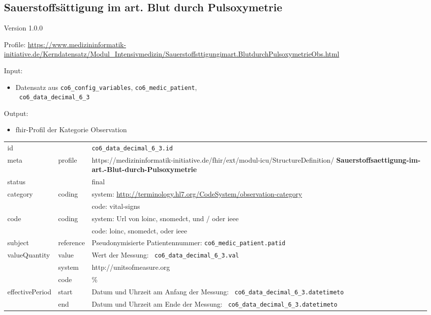 \subsection{Sauerstoffsättigung im art. Blut durch Pulsoxymetrie} 
\noindent Version 1.0.0

\noindent Profile: \url{https://www.medizininformatik-initiative.de/Kerndatensatz/Modul_Intensivmedizin/Sauerstoffsttigungimart.BlutdurchPulsoxymetrieObs.html}

\noindent Input:
\begin{itemize}
	\item Datensatz aus \texttt{co6\_config\_variables}, \texttt{co6\_medic\_patient}, \\ \texttt{
co6\_data\_decimal\_6\_3}
\end{itemize}
Output:
\begin{itemize}
        \item \ac{fhir}-Profil der Kategorie \glqq Observation\grqq{}
\end{itemize}
\begin{longtable}{|l|l|p{7.5cm}|}
        \hline
        \rowcolor{lightgray} \multicolumn{3}{|l|}{Data Mapping (inhaltlich)} \\ \hline
        id &  & \texttt{co6\_data\_decimal\_6\_3.id} \\ \hline
	meta & profile & https://medizininformatik-initiative.de/fhir/ext/modul-icu/StructureDefinition/\textbf{
Sauerstoffsaettigung-im-art.-Blut-durch-Pulsoxymetrie} \\ \hline 
	status &  & final  \\ \hline 
	category & coding & system: \url{http://terminology.hl7.org/CodeSystem/observation-category} \\
\cline{3-3}
	& & code: vital-signs \\ \hline
	code & coding & system: Url von \ac{loinc}, \ac{snomedct}, und / oder \ac{ieee} \\ 
	\cline{3-3} 
	 &  & code: \ac{loinc}, \ac{snomedct}, oder \ac{ieee} \\ \hline
	subject & reference & Pseudonymisierte Patientennummer: \texttt{co6\_medic\_patient.patid} \\ \hline
	valueQuantity & value & Wert der Messung: \texttt{
co6\_data\_decimal\_6\_3.val} \\
        \cline{2-3}
         & system & http://unitsofmeasure.org \\
         \cline{2-3}
         & code & \% \\ \hline
    effectivePeriod & start & Datum und Uhrzeit am Anfang der Messung: \texttt{
co6\_data\_decimal\_6\_3.datetimeto} \\
    \cline{2-3}
     & end & Datum und Uhrzeit am Ende der Messung: \texttt{
co6\_data\_decimal\_6\_3.datetimeto} \\ \hline
\end{longtable}


